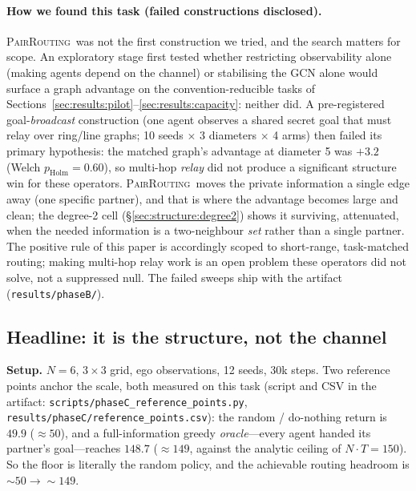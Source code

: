 \documentclass[10pt]{article}
\newcommand{\pairrouting}{\textsc{PairRouting}}
\newcommand{\SCfloor}{50}             %
\newcommand{\SCoracle}{149}           %
\begin{document}
\paragraph{How we found this task (failed constructions disclosed).}
\pairrouting\ was not the first construction we tried, and the search
matters for scope. An exploratory stage first tested whether restricting
observability alone (making agents depend on the channel) or stabilising the
GCN alone would surface a graph advantage on the convention-reducible tasks
of Sections~\ref{sec:results:pilot}--\ref{sec:results:capacity}: neither
did. A pre-registered goal-\emph{broadcast} construction (one agent observes
a shared secret goal that must relay over ring/line graphs; 10 seeds
$\times$ 3 diameters $\times$ 4 arms) then failed its primary hypothesis:
the matched graph's advantage at diameter 5 was $+3.2$ (Welch
$p_{\text{Holm}}=0.60$), so multi-hop \emph{relay} did not produce a
significant structure win for these operators. \pairrouting\ moves the
private information a single edge away (one specific partner), and that is
where the advantage becomes large and clean; the degree-2 cell
(\S\ref{sec:structure:degree2}) shows it surviving, attenuated, when the
needed information is a two-neighbour \emph{set} rather than a single
partner. The positive rule of this paper is accordingly scoped to
short-range, task-matched routing; making multi-hop relay work is an open
problem these operators did not solve, not a suppressed null. The failed
sweeps ship with the artifact (\texttt{results/phaseB/}).

\subsection{Headline: it is the structure, not the channel}
\label{sec:structure:headline}

\textbf{Setup.} $N{=}6$, $3{\times}3$ grid, ego observations, 12 seeds, 30k
steps. Two reference points anchor the scale, both measured on this task
(script and CSV in the artifact: \texttt{scripts/phaseC\_reference\_points.py},
\texttt{results/phaseC/reference\_points.csv}): the random / do-nothing
return is $49.9$ (${\approx}\SCfloor$), and a full-information greedy
\emph{oracle}---every agent handed its partner's goal---reaches $148.7$
(${\approx}\SCoracle$, against the analytic ceiling of $N \cdot T = 150$).
So the floor is literally the random
policy, and the achievable routing headroom is ${\sim}\SCfloor\to{\sim}\SCoracle$.
\end{document}
